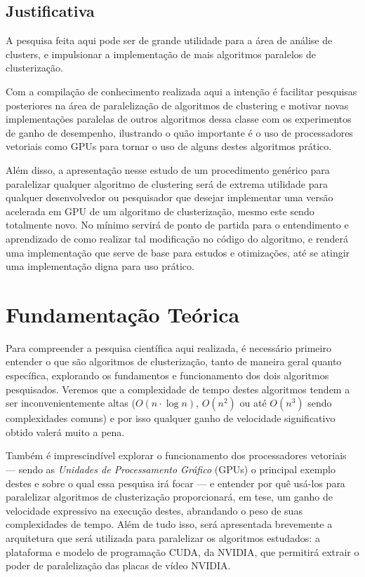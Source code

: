 \documentclass[12pt, %
openright, 
oneside, %
a4paper,    %
brazil]{facom-ufu-abntex2}
\def\qntAlgrtm{dois}
\begin{document}

\section{Justificativa}

A pesquisa feita aqui pode ser de grande utilidade para a área de análise de clusters, e impulsionar a implementação de mais algoritmos paralelos de clusterização.

Com a compilação de conhecimento realizada aqui a intenção é facilitar pesquisas posteriores na área de paralelização de algoritmos de clustering e motivar novas implementações paralelas de outros algoritmos dessa classe com os experimentos de ganho de desempenho, ilustrando o quão importante é o uso de processadores vetoriais como GPUs para tornar o uso de alguns destes algoritmos prático.

Além disso, a apresentação nesse estudo de um procedimento genérico para paralelizar qualquer algoritmo de clustering será de extrema utilidade para qualquer desenvolvedor ou pesquisador que desejar implementar uma versão acelerada em GPU de um algoritmo de clusterização, mesmo este sendo totalmente novo. No mínimo servirá de ponto de partida para o entendimento e aprendizado de como realizar tal modificação no código do algoritmo, e renderá uma implementação que serve de base para estudos e otimizações, até se atingir uma implementação digna para uso prático.





\chapter{Fundamentação Teórica}

Para compreender a pesquisa científica aqui realizada, é necessário primeiro entender o que são algoritmos de clusterização, tanto de maneira geral quanto específica, explorando os fundamentos e funcionamento dos \qntAlgrtm{} algoritmos pesquisados. Veremos que a complexidade de tempo destes algoritmos tendem a ser inconvenientemente altas ($O(n\cdot\log{n})$, $O(n^2)$ ou até $O(n^3)$ sendo complexidades comuns) e por isso qualquer ganho de velocidade significativo obtido valerá muito a pena.

Também é imprescindível explorar o funcionamento dos processadores vetoriais --- sendo as \textit{Unidades de Processamento Gráfico} (GPUs) o principal exemplo destes e sobre o qual essa pesquisa irá focar --- e entender por quê usá-los para paralelizar algoritmos de clusterização proporcionará, em tese, um ganho de velocidade expressivo na execução destes, abrandando o peso de suas complexidades de tempo. Além de tudo isso, será apresentada brevemente a arquitetura que será utilizada para paralelizar os algoritmos estudados: a plataforma e modelo de programação CUDA, da NVIDIA, que permitirá extrair o poder de paralelização das placas de vídeo NVIDIA.
\end{document}
